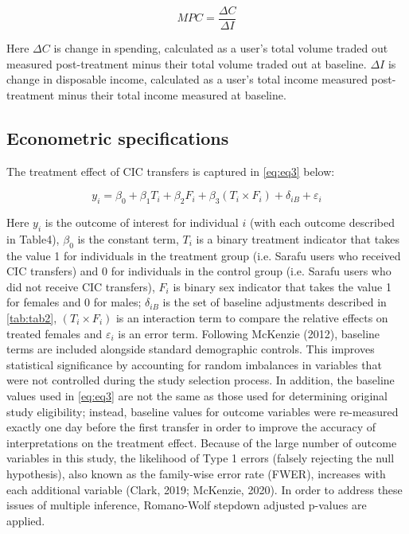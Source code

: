 \documentclass[12pt]{article}
\begin{document}
\begin{equation}
    M P C=\frac{\Delta C}{\Delta I}
    \label{eq:eq2}
\end{equation}

Here $\Delta C$ is change in spending, calculated as a user’s total volume traded out measured post-treatment minus their total volume traded out at baseline. $\Delta I$ is change in disposable income, calculated as a user’s total income measured post-treatment minus their total income measured at baseline.

\subsection{Econometric specifications}
The treatment effect of CIC transfers is captured in \autoref{eq:eq3} below:

\begin{equation}
    y_{i}=\beta_{0}+\beta_{1} T_{i}+\beta_{2} F_{i}+\beta_{3}\left(T_{i} \times F_{i}\right)+\delta_{i B}+\varepsilon_{i}
    \label{eq:eq3}
\end{equation}

Here $y_{i}$ is the outcome of interest for individual $i$ (with each outcome described in Table4), $\beta_{0}$ is the constant term, $T_{i}$ is a binary treatment indicator that takes the value 1 for individuals in the treatment group (i.e. Sarafu users who received CIC transfers) and 0 for individuals in the control group (i.e. Sarafu users who did not receive CIC transfers), $F_{i}$ is binary sex indicator that takes the value 1 for females and 0 for males; $\delta_{i B}$ is the set of baseline adjustments described in \autoref{tab:tab2}, $\left(T_{i} \times F_{i}\right)$ is an interaction term to compare the relative effects on treated females and $\varepsilon_{i}$ is an error term. Following McKenzie (2012), baseline terms are included alongside standard demographic controls. This improves statistical significance by accounting for random imbalances in variables that were not controlled during the study selection process. In addition, the baseline values used in \autoref{eq:eq3} are not the same as those used for determining original study eligibility; instead, baseline values for outcome variables were re-measured exactly one day before the first transfer in order to improve the accuracy of interpretations on the treatment effect. Because of the large number of outcome variables in this study, the likelihood of Type 1 errors (falsely rejecting the null hypothesis), also known as the family-wise error rate (FWER), increases with each additional variable (Clark, 2019; McKenzie, 2020). In order to address these issues of multiple inference, Romano-Wolf stepdown adjusted p-values are applied.
\end{document}

